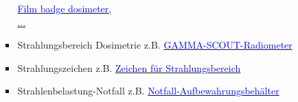 \begin{enumerate}
\begin{itemize}
\begin{itemize}
\href{https://en.wikipedia.org/wiki/Film_badge_dosimeter}{\textcolor{blue}{Film badge dosimeter},\\ \textcolor{blue}{...}}
\item Strahlungsbereich Dosimetrie z.B.
\href{https://www.gamma-scout.com/DE/Technische-Daten.php}{\textcolor{blue}{GAMMA-SCOUT-Radiometer}}
\item Strahlungszeichen z.B. 
\href{https://de.wikipedia.org/wiki/Strahlenwarnzeichen}{\textcolor{blue}{Zeichen für Strahlungsbereich}}
\item Strahlenbelastung-Notfall z.B. 
\href{http://www.gilligan-engineering.co.uk/news/71-emergency-source-containers}{\textcolor{blue}{Notfall-Aufbewahrungsbehälter}} 
\end{itemize}
\end{itemize}
\end{enumerate}













